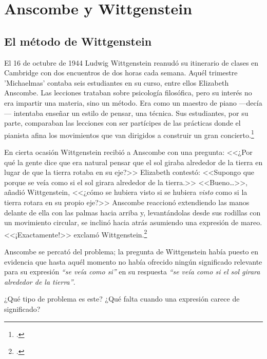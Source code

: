 \section{Anscombe y Wittgenstein}

\subsection{El método de Wittgenstein}
El 16 de octubre de 1944 Ludwig Wittgenstein reanudó su itinerario de clases en
Cambridge con dos encuentros de dos horas cada semana. Aquél trimestre
'Michaelmas' contaba seis estudiantes en su curso, entre ellos Elizabeth
Anscombe. Las lecciones trataban sobre psicología filosófica, pero su interés no
era impartir una materia, sino un método. Era como un maestro de piano
---decía--- intentaba enseñar un estilo de pensar, una técnica. Sus estudiantes,
por su parte, comparaban las lecciones con ser partícipes de las prácticas donde
el pianista afina los movimientos que van dirigidos a construir un gran
concierto.\footcite[p.~357]{pubnpriv}

En cierta ocasión Wittgenstein recibió a Anscombe con una pregunta: <<¿Por qué
la gente dice que era natural pensar que el sol giraba alrededor de la tierra en
lugar de que la tierra rotaba en su eje?>> Elizabeth contestó: <<Supongo que
porque se veía como si el sol girara alrededor de la tierra.>> <<Bueno\ldots>>,
añadió Wittgenstein, <<¿cómo se hubiera visto si se hubiera \emph{visto} como si
la tierra rotara en su propio eje?>> Anscombe reaccionó extendiendo las manos
delante de ella con las palmas hacia arriba y, levantándolas desde sus rodillas
con un movimiento circular, se inclinó hacia atrás asumiendo una expresión de
mareo. <<¡Exactamente!>> exclamó Wittgenstein.\footcite[cf.~][p.~151]{IWT}

Anscombe se percató del problema; la pregunta de Wittgenstein había puesto en
evidencia que hasta aquél momento no había ofrecido ningún significado relevante
para su expresión \emph{``se veía como si''} en su respuesta \emph{``se veía
  como si el sol girara alrededor de la tierra''}.

¿Qué tipo de problema es este? ¿Qué falta cuando una expresión carece de
significado?

